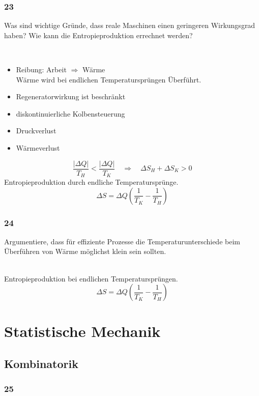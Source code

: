\documentclass[12pt,a4paper]{report}
\newenvironment{myfrag}{\begin{it}}{\end{it}\vspace{3mm}\par}
\numberwithin{equation}{section}
\begin{document}
\subsection{23}
\begin{myfrag}
Was sind wichtige Gründe, dass reale Maschinen einen geringeren Wirkungsgrad
haben? Wie kann die Entropieproduktion errechnet werden?
\end{myfrag}
\quad \\
\begin{itemize}


\item Reibung: Arbeit $\Rightarrow$ Wärme \\
Wärme wird bei endlichen Temperatursprüngen Überführt.
\item Regeneratorwirkung ist beschränkt
\item diskontinuierliche Kolbensteuerung
\item Druckverlust
\item Wärmeverlust
\end{itemize}
$$\dfrac{|\Delta Q|}{T_H} < \dfrac{| \Delta Q|}{T_K} \quad \Rightarrow \quad \Delta S_H + \Delta S_K > 0 $$ 
Entropieproduktion durch endliche Temperatursprünge. 
$$ \Delta S = \Delta Q \left( \dfrac{1}{T_K} - \dfrac{1}{T_H}\right) $$
\subsection{24}
\begin{myfrag}
Argumentiere, dass für effiziente Prozesse die Temperaturunterschiede beim
Überführen von Wärme möglichst klein sein sollten.
\end{myfrag}
\quad \\
Entropieproduktion bei endlichen Temperatursprüngen. \\ $$ \Delta S = \Delta Q \left( \dfrac{1}{T_K} - \dfrac{1}{T_H}\right) $$

\chapter{Statistische Mechanik}
\section{Kombinatorik}
\subsection{25}
\begin{myfrag}
\end{myfrag}
\end{document}

